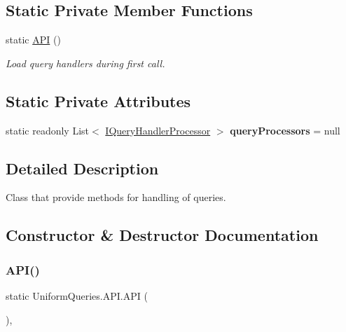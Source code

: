 \subsection*{Static Private Member Functions}
\begin{DoxyCompactItemize}
\item 
static \mbox{\hyperlink{class_uniform_queries_1_1_a_p_i_a8dbe3d00dcf507ab3cea1dc58e1e154f}{A\+PI}} ()
\begin{DoxyCompactList}\small\item\em Load query handlers during first call. \end{DoxyCompactList}\end{DoxyCompactItemize}
\subsection*{Static Private Attributes}
\begin{DoxyCompactItemize}
\item 
\mbox{\label{class_uniform_queries_1_1_a_p_i_a4af16485a14a5acbd5ac442cf0467496}} 
static readonly List$<$ \mbox{\hyperlink{interface_uniform_queries_1_1_i_query_handler_processor}{I\+Query\+Handler\+Processor}} $>$ {\bfseries query\+Processors} = null
\end{DoxyCompactItemize}


\subsection{Detailed Description}
Class that provide methods for handling of queries. 



\subsection{Constructor \& Destructor Documentation}
\mbox{\label{class_uniform_queries_1_1_a_p_i_a8dbe3d00dcf507ab3cea1dc58e1e154f}} 
\subsubsection{\texorpdfstring{A\+P\+I()}{API()}}
{\footnotesize\ttfamily static Uniform\+Queries.\+A\+P\+I.\+A\+PI (\begin{DoxyParamCaption}{ }\end{DoxyParamCaption})\hspace{0.3cm}{\ttfamily [static]}, {\ttfamily [private]}}



